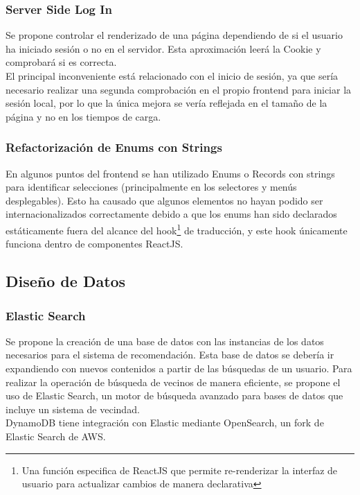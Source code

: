 \subsubsection{Server Side Log In}
Se propone controlar el renderizado de una página dependiendo de si el usuario ha iniciado sesión o no en el servidor. 
Esta aproximación leerá la Cookie y comprobará si es correcta.\\
El principal inconveniente está relacionado con el inicio de sesión, ya que sería necesario realizar una segunda comprobación en el propio frontend para iniciar la sesión local, por lo que la única mejora se vería reflejada en el tamaño de la página y no en los tiempos de carga. 
\subsubsection{Refactorización de Enums con Strings}
En algunos puntos del frontend se han utilizado Enums o Records con strings para identificar selecciones (principalmente en los selectores y menús desplegables). 
Esto ha causado que algunos elementos no hayan podido ser internacionalizados correctamente debido a que los enums han sido declarados estáticamente fuera del alcance del hook\footnote{Una función especifica de ReactJS que permite re-renderizar la interfaz de usuario para actualizar cambios de manera declarativa} de traducción, y este hook únicamente funciona dentro de componentes ReactJS.

\subsection{Diseño de Datos}

\subsubsection{Elastic Search}
Se propone la creación de una base de datos con las instancias de los datos necesarios para el sistema de recomendación. Esta base de datos se debería ir expandiendo con nuevos contenidos a partir de las búsquedas de un usuario. 
Para realizar la operación de búsqueda de vecinos de manera eficiente, se propone el uso de Elastic Search\cite{elastic}, un motor de búsqueda avanzado para bases de datos que incluye un sistema de vecindad.\\
DynamoDB tiene integración con Elastic mediante OpenSearch, un fork de Elastic Search de AWS. 


